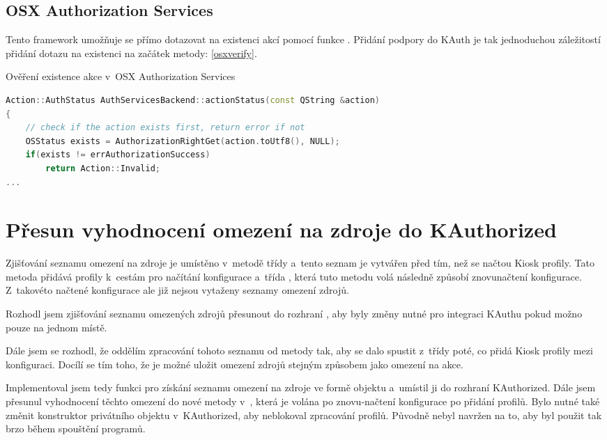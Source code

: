 \subsection*{OSX Authorization Services}
Tento framework umožňuje se přímo dotazovat na existenci akcí pomocí funkce \linebreak{}. Přidání podpory do KAuth je tak jednoduchou záležitostí přidání dotazu na existenci na začátek metody: \ref{osxverify}.
\begin{mylisting}
\caption{Ověření existence akce v~OSX Authorization Services}
\label{osxverify}
\begin{lstlisting}[language=C++]
Action::AuthStatus AuthServicesBackend::actionStatus(const QString &action)
{
    // check if the action exists first, return error if not
    OSStatus exists = AuthorizationRightGet(action.toUtf8(), NULL);
    if(exists != errAuthorizationSuccess)
        return Action::Invalid;
...
\end{lstlisting}
\end{mylisting}

\section{Přesun vyhodnocení omezení na zdroje do KAuthorized}
Zjišťování seznamu omezení na zdroje je umístěno v~metodě  třídy  a~tento seznam je vytvářen před tím, než se načtou Kiosk profily. Tato metoda přidává profily k~cestám pro načítání konfigurace a~třída , která tuto metodu volá následně způsobí znovunačtení konfigurace. Z~takovéto načtené konfigurace ale již nejsou vytaženy seznamy omezení zdrojů.

Rozhodl jsem zjišťování seznamu omezených zdrojů přesunout do rozhraní , aby byly změny nutné pro integraci KAuthu pokud možno pouze na jednom místě.

Dále jsem se rozhodl, že oddělím zpracování tohoto seznamu od metody  tak, aby se dalo spustit z~třídy  poté, co  přidá Kiosk profily mezi konfiguraci. Docílí se tím toho, že je možné uložit omezení zdrojů stejným způsobem jako omezení na akce.

Implementoval jsem tedy funkci  pro získání seznamu omezení na zdroje ve formě objektu  a~umístil ji do rozhraní KAuthorized. Dále jsem přesunul vyhodnocení těchto omezení do nové metody \linebreak{} v~, která je volána po znovu-načtení konfigurace po přidání profilů. Bylo nutné také změnit konstruktor privátního objektu v~KAuthorized, aby neblokoval zpracování profilů. Původně nebyl navržen na to, aby byl použit tak brzo během spouštění programů.

